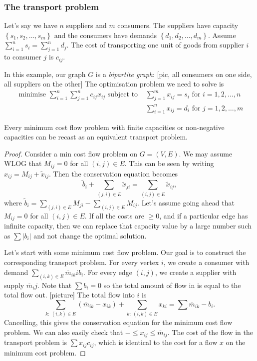 \documentclass[egregdoesnotlikesansseriftitles,a4paper]{scrartcl}
\begin{document}
\subsubsection{The transport problem}
Let's say we have $n$ suppliers and $m$ consumers. The suppliers have capacity $\left\{s_1 , s_2 , \ldots , s_m\right\}$ and the consumers have demands $\left\{d_1 ,d_2 , \ldots , d_m\right\}$. Assume $\sum_{i=1}^{n}s_i=\sum_{j=1}^{n}d_j$. The cost of transporting one unit of goods from supplier $i$ to consumer $j$ is $c_{ij}$. 

In this example, our graph $G$ is a \emph{bipartite graph}: 
[pic, all consumers on one side, all suppliers on the other]
The optimisation problem we need to solve is
\begin{align*}
	\text{ minimise } \sum_{i=1}^{n} \sum_{j=1}^{n} c_{ij} x_{ij} \text{ subject to }& \sum_{j=1}^{m}x_{ij}=s_i \text{ for } i=1,2, \ldots ,n\\& \sum_{i=1}^{n}x_{ij}=d_i \text{ for } j=1,2,\ldots ,m
\end{align*}
\begin{theorem}
	 Every minimum cost flow problem with finite capacities or non-negative capacities can be recast as an equivalent transport problem. 
\end{theorem}
\begin{proof}
	 Consider a min cost flow problem on $G=(V,E)$. We may assume WLOG that $M_{ij}=0$ for all $(i,j)\in E$. This can be seen by writing $x_{ij}=M_{ij}+\widetilde{x}_{ij}$. Then the conservation equation becomes \[
	 \widetilde{b}_i+\sum_{(j,i) \in E} \widetilde{x}_{ji}=\sum_{(i,j) \in E} \widetilde{x}_{ij}
	 ,\]  where $\widetilde{b}_{i}=\sum_{(j,i) \in E}M_{ji}-\sum_{(i,j) \in E}M_{ij}$. Let's assume going ahead that $M_{ij}=0$ for all $(i,j) \in E$. If all the costs are $\geq 0$, and if a particular edge has infinite capacity, then we can replace that capacity value by a large number such as $\sum |b_{i}|$ and not change the optimal solution.

	 Let's start with some minimum cost flow problem. Our goal is to construct the corresponding transport problem. For every vertex $i$, we create a consumer with demand $\sum_{(i,k)\in E}^{}\overline{m}_{ik} i b_{i}$. For every edge $(i,j)$, we create a supplier with supply $\overline{m}_ij$. Note that $\sum b_{i}=0$ so the total amount of flow in is equal to the total flow out. [picture] The total flow into $i$ is \[
	 \sum_{k: \ (i,k) \in E} (\overline{m}_{ik}-x_{ik})+\sum_{k: \ (i,k) \in E} x_{ki}=\sum \overline{m}_{ik} - b_{i}
	 .\]  
	 Cancelling, this gives the conservation equation for the minimum cost flow problem. We can also easily check that $- \leq x_{ij} \leq \overline{m}_{ij}$. The cost of the flow in the transport problem is $\sum x_{ij}c_{ij}$, which is identical to the cost for a flow $x$ on the minimum cost problem. 
\end{proof}
\end{document}
